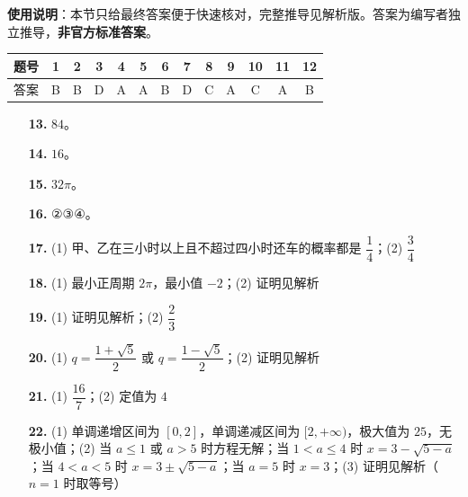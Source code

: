 
\begin{gknotice}
\textbf{使用说明}：本节只给最终答案便于快速核对，完整推导见解析版。答案为编写者独立推导，\textbf{非官方标准答案}。
\end{gknotice}

\begin{center}\begin{tabular}{ccccccccccccc}
\toprule
题号 & 1 & 2 & 3 & 4 & 5 & 6 & 7 & 8 & 9 & 10 & 11 & 12 \\
\midrule
答案 & B & B & D & A & A & B & D & C & A & C & A & B \\
\bottomrule
\end{tabular}\end{center}

\begin{itemize}[leftmargin=2.6em]
  \item[\textbf{13.}] $84$。
  \item[\textbf{14.}] $16$。
  \item[\textbf{15.}] $32\pi$。
  \item[\textbf{16.}] ②③④。
\end{itemize}

\begin{itemize}[leftmargin=2.6em]
  \item[\textbf{17.}] (1) 甲、乙在三小时以上且不超过四小时还车的概率都是 $\dfrac14$；(2) $\dfrac34$
  \item[\textbf{18.}] (1) 最小正周期 $2\pi$，最小值 $-2$；(2) 证明见解析
  \item[\textbf{19.}] (1) 证明见解析；(2) $\dfrac23$
  \item[\textbf{20.}] (1) $q=\dfrac{1+\sqrt5}{2}$ 或 $q=\dfrac{1-\sqrt5}{2}$；(2) 证明见解析
  \item[\textbf{21.}] (1) $\dfrac{16}{7}$；(2) 定值为 $4$
  \item[\textbf{22.}] (1) 单调递增区间为 $[0,2]$，单调递减区间为 $[2,+\infty)$，极大值为 $25$，无极小值；(2) 当 $a\leqslant1$ 或 $a>5$ 时方程无解；当 $1<a\leqslant4$ 时 $x=3-\sqrt{5-a}$；当 $4<a<5$ 时 $x=3\pm\sqrt{5-a}$；当 $a=5$ 时 $x=3$；(3) 证明见解析（$n=1$ 时取等号）
\end{itemize}
